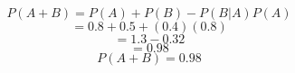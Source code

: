 \documentclass{article}
\begin{document}
\begin{enumerate}[label=13.\arabic{enumi}.\arabic{enumii}]
\begin{equation}
 \end{equation}
 \begin{equation}
 P(A+B)= P(A)+P(B)-P(B \vert A)P(A)
 \end{equation}
 \begin{equation}
 =0.8+0.5+(0.4)(0.8)
 \end{equation}
 \begin{equation}
 =1.3-0.32
 \end{equation}
 \begin{equation}
 = 0.98
 \end{equation}
 \begin{equation}
\boxed{ P(A+B)=0.98}
 \end{equation}
    
\end{enumerate}
\end{document}
